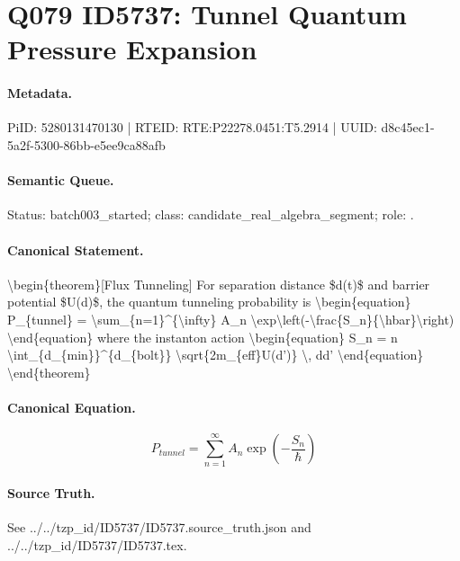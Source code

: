 \section*{Q079 ID5737: Tunnel Quantum Pressure Expansion}
\paragraph{Metadata.}
PiID: 5280131470130 | RTEID: RTE:P22278.0451:T5.2914 | UUID: d8c45ec1-5a2f-5300-86bb-e5ee9ca88afb

\paragraph{Semantic Queue.}
Status: batch003\_started; class: candidate\_real\_algebra\_segment; role: .

\paragraph{Canonical Statement.}
\textbackslash{}begin\{theorem\}[Flux Tunneling] For separation distance \$d(t)\$ and barrier potential \$U(d)\$, the quantum tunneling probability is \textbackslash{}begin\{equation\} P\_\{tunnel\} = \textbackslash{}sum\_\{n=1\}\textasciicircum{}\{\textbackslash{}infty\} A\_n \textbackslash{}exp\textbackslash{}left(-\textbackslash{}frac\{S\_n\}\{\textbackslash{}hbar\}\textbackslash{}right) \textbackslash{}end\{equation\} where the instanton action \textbackslash{}begin\{equation\} S\_n = n \textbackslash{}int\_\{d\_\{min\}\}\textasciicircum{}\{d\_\{bolt\}\} \textbackslash{}sqrt\{2m\_\{eff\}U(d')\} \textbackslash{}, dd' \textbackslash{}end\{equation\} \textbackslash{}end\{theorem\}

\paragraph{Canonical Equation.}
\[
\begin{equation} P_{tunnel} = \sum_{n=1}^{\infty} A_n \exp\left(-\frac{S_n}{\hbar}\right) \end{equation}
\]

\paragraph{Source Truth.}
See ../../tzp\_id/ID5737/ID5737.source\_truth.json and ../../tzp\_id/ID5737/ID5737.tex.
